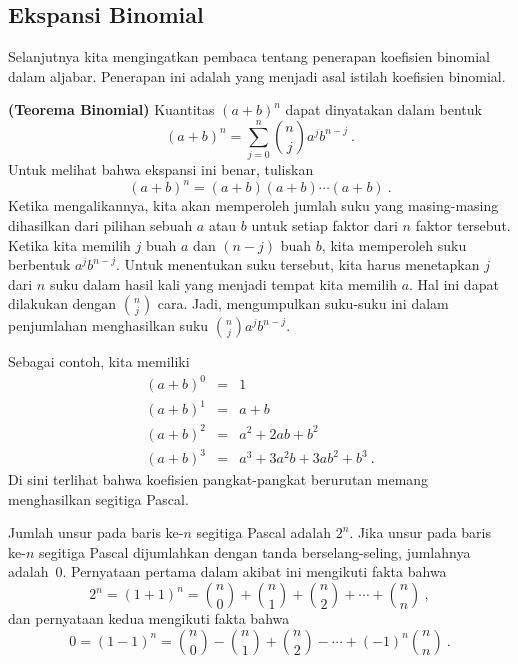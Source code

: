 
\subsection*{Ekspansi Binomial}

Selanjutnya kita mengingatkan pembaca tentang penerapan koefisien binomial dalam aljabar.
Penerapan ini adalah  yang menjadi asal istilah koefisien binomial.
\begin{theorem}\label{thm 3.9}{\bf (Teorema Binomial)} Kuantitas $(a +
b)^n$ dapat dinyatakan dalam bentuk
$$ (a + b)^n = \sum_{j = 0}^n {n \choose j} a^j b^{n - j}\ .
$$
\proof Untuk melihat bahwa ekspansi ini benar, tuliskan
$$ (a + b)^n = (a + b)(a + b) \cdots (a + b)\ .
$$ Ketika mengalikannya, kita akan memperoleh jumlah suku yang masing-masing dihasilkan
dari pilihan sebuah $a$ atau $b$ untuk setiap faktor dari $n$ faktor tersebut.  Ketika kita memilih
$j$ buah $a$ dan $(n - j)$ buah $b$, kita memperoleh suku berbentuk $a^j b^{n - j}$.
Untuk menentukan suku tersebut, kita harus menetapkan $j$ dari $n$ suku dalam hasil
kali yang menjadi tempat kita memilih $a$.  Hal ini dapat dilakukan dengan
$n \choose j$ cara.   Jadi, mengumpulkan suku-suku ini dalam penjumlahan menghasilkan
suku ${n \choose j} a^j b^{n - j}$.
\end{theorem}
\par
Sebagai contoh, kita memiliki
\begin{eqnarray*} (a + b)^0 & = & 1 \\ (a + b)^1 & = & a + b \\ (a + b)^2 & = & a^2 +
2ab + b^2 \\ (a + b)^3 & = & a^3 + 3a^2b + 3ab^2 + b^3\ .
\end{eqnarray*}
Di sini terlihat bahwa koefisien pangkat-pangkat berurutan memang menghasilkan segitiga
Pascal.

\begin{corollary}\label{cor 3.1}  Jumlah unsur pada baris ke-$n$ segitiga Pascal adalah
$2^n$.  Jika unsur pada baris ke-$n$ segitiga Pascal dijumlahkan dengan tanda
berselang-seling, jumlahnya adalah~0.
\proof Pernyataan pertama dalam akibat ini mengikuti fakta bahwa
$$ 2^n = (1 + 1)^n = {n \choose 0} + {n \choose 1} + {n \choose 2} + \cdots + {n
\choose n}\ ,
$$ dan pernyataan kedua mengikuti fakta bahwa
$$ 0 = (1 - 1)^n = {n \choose 0} - {n \choose 1} + {n \choose 2}- \cdots + {(-1)^n}{n
\choose n}\ .
$$
\end{corollary}

